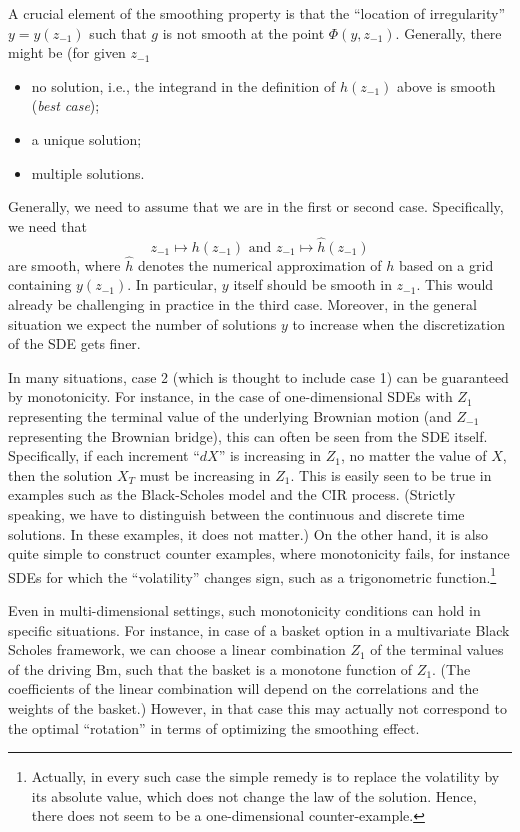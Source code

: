 \documentclass[11pt]{article}
\begin{document}
A crucial element of the smoothing property is that the ``location of
irregularity'' $y = y(z_{-1})$ such that $g$ is not smooth at the point
$\Phi(y, z_{-1})$. Generally, there might be (for given $z_{-1}$
\begin{itemize}
\item no solution, i.e., the integrand in the definition of $h(z_{-1})$ above
  is smooth (\textit{best case});
\item a unique solution;
\item multiple solutions.
\end{itemize}
Generally, we need to assume that we are in the first or second
case. Specifically, we need that
\begin{equation*}
   z_{-1} \mapsto h(z_{-1}) \text{ and } z_{-1} \mapsto \hat{h}(z_{-1})
\end{equation*}
are smooth, where $\hat{h}$ denotes the numerical approximation of $h$ based
on a grid containing $y(z_{-1})$. In particular, $y$ itself should be smooth
in $z_{-1}$. This would already be challenging in practice in the third
case. Moreover, in the general situation we expect the number of solutions $y$
to increase when the discretization of the SDE gets finer. 

In many situations, case 2 (which is thought to include case 1) can be
guaranteed by monotonicity. For instance, in the case of one-dimensional SDEs
with $Z_1$ representing the terminal value of the underlying Brownian motion
(and $Z_{-1}$ representing the Brownian bridge), this can often be seen from
the SDE itself. Specifically, if each increment ``$dX$'' is increasing in
$Z_1$, no matter the value of $X$, then the solution $X_T$ must be increasing
in $Z_1$. This is easily seen to be true in examples such as the Black-Scholes
model and the CIR process. (Strictly speaking, we have to distinguish between
the continuous and discrete time solutions. In these examples, it does not
matter.) On the other hand, it is also quite simple to construct counter
examples, where monotonicity fails, for instance SDEs for which the
``volatility'' changes sign, such as a trigonometric
function.\footnote{Actually, in every such case the simple remedy is to
  replace the volatility by its absolute value, which does not change the law
  of the solution. Hence, there does not seem to be a one-dimensional
  counter-example.}

Even in multi-dimensional settings, such monotonicity conditions can hold in
specific situations. For instance, in case of a basket option in a
multivariate Black Scholes framework, we can choose a linear combination $Z_1$
of the terminal values of the driving Bm, such that the basket is a monotone
function of $Z_1$. (The coefficients of the linear combination will depend on
the correlations and the weights of the basket.) However, in that case this
may actually not correspond to the optimal ``rotation'' in terms of
optimizing the smoothing effect.
\end{document}
